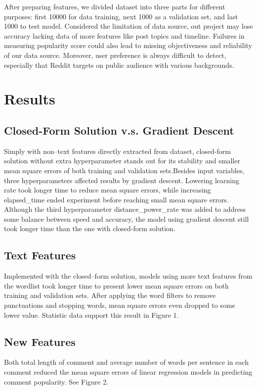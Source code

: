 \documentclass[letterpaper, 12pt]{article}
\begin{document}
After preparing features, we divided dataset into three parts for different purposes: first 10000 for data training, next 1000 as a validation set, and last 1000 to test model. Considered the limitation of data source, out project may lose accuracy lacking data of more features like post topics and timeline. Failures in measuring popularity score could also lead to missing objectiveness and reliability of our data source. Moreover, user preference is always difficult to detect, especially that Reddit targets on public audience with various backgrounds.

\section*{Results}


\subsection*{Closed-Form Solution v.s. Gradient Descent}

Simply with non\---text features directly extracted from dataset, closed-form solution without extra hyperparameter stands out for its stability and smaller mean square errors of both training and validation sets.Besides input variables, three hyperparameters affected results by gradient descent. Lowering learning rate took longer time to reduce mean square errors, while increasing elapsed\_time ended experiment before reaching small mean square errors. Although the third hyperparameter distance\_power\_rate was added to address some balance between speed and accuracy, the model using gradient descent still took longer time than the one with closed-form solution.

\subsection*{Text Features}

Implemented with the closed\---form solution, models using more text features from the wordlist took longer time to present lower mean square errors on both training and validation sets. After applying the word filters to remove punctuations and stopping words, mean square errors even dropped to some lower value. Statistic data support this result in Figure 1.


\subsection*{New Features}
Both total length of comment and average number of words per sentence in each comment reduced the mean square errors of linear regression models in predicting comment popularity. See Figure 2.
\end{document}
